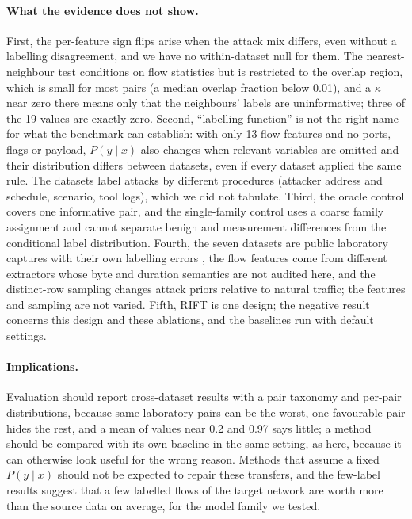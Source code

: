 \documentclass[11pt]{article}
\begin{document}
\paragraph{What the evidence does not show.}
First, the per-feature sign flips arise when the attack mix differs, even without a labelling disagreement, and we have no within-dataset null for them.
The nearest-neighbour test conditions on flow statistics but is restricted to the overlap region, which is small for most pairs (a median overlap fraction below 0.01), and a $\kappa$ near zero there means only that the neighbours' labels are uninformative; three of the 19 values are exactly zero.
Second, ``labelling function'' is not the right name for what the benchmark can establish: with only 13 flow features and no ports, flags or payload, $P(y\mid x)$ also changes when relevant variables are omitted and their distribution differs between datasets, even if every dataset applied the same rule.
The datasets label attacks by different procedures (attacker address and schedule, scenario, tool logs), which we did not tabulate.
Third, the oracle control covers one informative pair, and the single-family control uses a coarse family assignment and cannot separate benign and measurement differences from the conditional label distribution.
Fourth, the seven datasets are public laboratory captures with their own labelling errors \citep{engelen2021troubleshooting}, the flow features come from different extractors whose byte and duration semantics are not audited here, and the distinct-row sampling changes attack priors relative to natural traffic; the features and sampling are not varied.
Fifth, RIFT is one design; the negative result concerns this design and these ablations, and the baselines run with default settings.

\paragraph{Implications.}
Evaluation should report cross-dataset results with a pair taxonomy and per-pair distributions, because same-laboratory pairs can be the worst, one favourable pair hides the rest, and a mean of values near 0.2 and 0.97 says little; a method should be compared with its own baseline in the same setting, as here, because it can otherwise look useful for the wrong reason.
Methods that assume a fixed $P(y\mid x)$ should not be expected to repair these transfers, and the few-label results suggest that a few labelled flows of the target network are worth more than the source data on average, for the model family we tested.
\end{document}
